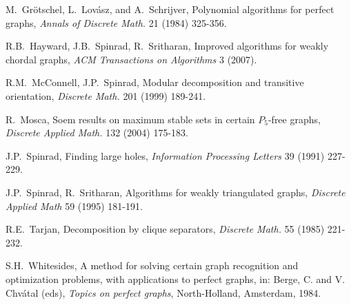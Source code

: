 \documentclass[11pt]{article}
\newcommand{\0}{\text{ has a co-join to }}
\newcommand{\1}{\text{ has a join to }}
\begin{document}
\begin{footnotesize}
\begin{thebibliography}{99}
    M.~Gr\"otschel, L.~Lov\'asz, and A.~Schrijver,
    Polynomial algorithms for perfect graphs,
    {\sl Annals of Discrete Math.} 21 (1984) 325-356.
 
    R.B.~Hayward, J.B.~Spinrad, R.~Sritharan,
    Improved algorithms for weakly chordal graphs,
    {\sl ACM Transactions on Algorithms} 3 (2007).

    R.M.~McConnell, J.P.~Spinrad,
    Modular decomposition and transitive orientation,
    {\sl Discrete Math.} 201 (1999) 189-241.

    R.~Mosca, 
    Soem results on maximum stable sets in certain $P_5$-free graphs,
    {\sl Discrete Applied Math.} 132 (2004) 175-183.


    J.P.~Spinrad,
    Finding large holes,
    {\sl Information Processing Letters} 39 (1991) 227-229.

    J.P.~Spinrad, R.~Sritharan,
    Algorithms for weakly triangulated graphs,
    {\sl Discrete Applied Math} 59 (1995) 181-191.

    R.E.~Tarjan,
    Decomposition by clique separators,
    {\sl Discrete Math.} 55 (1985) 221-232.

    S.H.~Whitesides,
    A method for solving certain graph recognition and optimization
    problems, with applications to perfect graphs, in: Berge, C.
    and V. Chv\'atal (eds),
    {\sl Topics on perfect graphs},
    North-Holland, Amsterdam, 1984.

\end{thebibliography}

\end{footnotesize}
\end{document}
